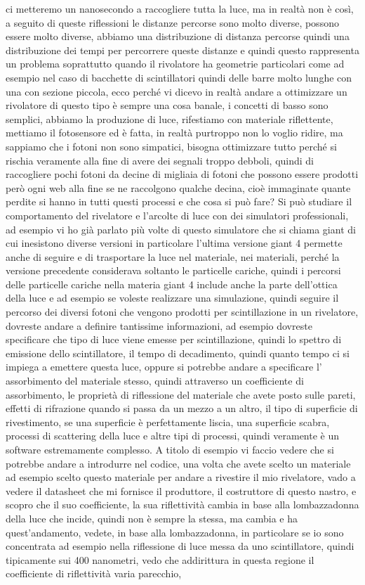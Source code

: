 ci metteremo un nanosecondo a raccogliere tutta la luce, ma in realtà non è così, a seguito di queste riflessioni le distanze percorse sono molto diverse, possono essere molto diverse, abbiamo una distribuzione di distanza percorse quindi una distribuzione dei tempi per percorrere queste distanze e quindi questo rappresenta un problema soprattutto quando il rivolatore ha geometrie particolari come ad esempio nel caso di bacchette di scintillatori quindi delle barre molto lunghe con una con sezione piccola, ecco perché vi dicevo in realtà andare a ottimizzare un rivolatore di questo tipo è sempre una cosa banale, i concetti di basso sono semplici, abbiamo la produzione di luce, rifestiamo con materiale riflettente, mettiamo il fotosensore ed è fatta, in realtà purtroppo non lo voglio ridire, ma sappiamo che i fotoni non sono simpatici, bisogna ottimizzare tutto perché si rischia veramente alla fine di avere dei segnali troppo debboli, quindi di raccogliere pochi fotoni da decine di migliaia di fotoni che possono essere prodotti però ogni web alla fine se ne raccolgono qualche decina, cioè immaginate quante perdite si hanno in tutti questi processi e che cosa si può fare? Si può studiare il comportamento del rivelatore e l'arcolte di luce con dei simulatori professionali, ad esempio vi ho già parlato più volte di questo simulatore che si chiama giant di cui inesistono diverse versioni in particolare l'ultima versione giant 4 permette anche di seguire e di trasportare la luce nel materiale, nei materiali, perché la versione precedente considerava soltanto le particelle cariche, quindi i percorsi delle particelle cariche nella materia giant 4 include anche la parte dell'ottica della luce e ad esempio se voleste realizzare una simulazione, quindi seguire il percorso dei diversi fotoni che vengono prodotti per scintillazione in un rivelatore, dovreste andare a definire tantissime informazioni, ad esempio dovreste specificare che tipo di luce viene emesse per scintillazione, quindi lo spettro di emissione dello scintillatore, il tempo di decadimento, quindi quanto tempo ci si impiega a emettere questa luce, oppure si potrebbe andare a specificare l' assorbimento del materiale stesso, quindi attraverso un coefficiente di assorbimento, le proprietà di riflessione del materiale che avete posto sulle pareti, effetti di rifrazione quando si passa da un mezzo a un altro, il tipo di superficie di rivestimento, se una superficie è perfettamente liscia, una superficie scabra, processi di scattering della luce e altre tipi di processi, quindi veramente è un software estremamente complesso. A titolo di esempio vi faccio vedere che si potrebbe andare a introdurre nel codice, una volta che avete scelto un materiale ad esempio scelto questo materiale per andare a rivestire il mio rivelatore, vado a vedere il datasheet che mi fornisce il produttore, il costruttore di questo nastro, e scopro che il suo coefficiente, la sua riflettività cambia in base alla lombazzadonna della luce che incide, quindi non è sempre la stessa, ma cambia e ha quest'andamento, vedete, in base alla lombazzadonna, in particolare se io sono concentrata ad esempio nella riflessione di luce messa da uno scintillatore, quindi tipicamente sui 400 nanometri, vedo che addirittura in questa regione il coefficiente di riflettività varia parecchio,

